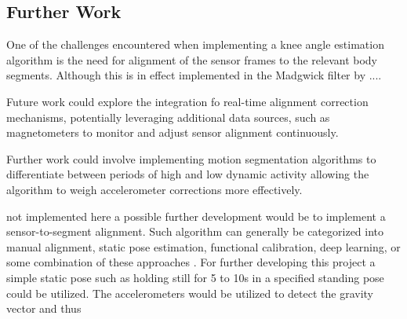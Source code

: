 \subsection{Further Work}
One of the challenges encountered when implementing a knee angle estimation algorithm is the need for alignment of the sensor frames to the relevant body segments. Although this is in effect implemented in the Madgwick filter by .... 


Future work could explore the integration fo real-time alignment correction mechanisms, potentially leveraging additional data sources, such as magnetometers to monitor and adjust sensor alignment continuously.

Further work could involve implementing motion segmentation algorithms to differentiate between periods of high and low dynamic activity allowing the algorithm to weigh accelerometer corrections more effectively.

not implemented here a possible further development would be to implement a sensor-to-segment alignment. Such algorithm can generally be categorized into manual alignment, static pose estimation, functional calibration, deep learning, or some combination of these approaches \cite{rhudy_knee_2024}. For further developing this project a simple static pose such as holding still for 5 to 10s in a specified standing pose could be utilized. The accelerometers would be utilized to detect the gravity vector and thus 



